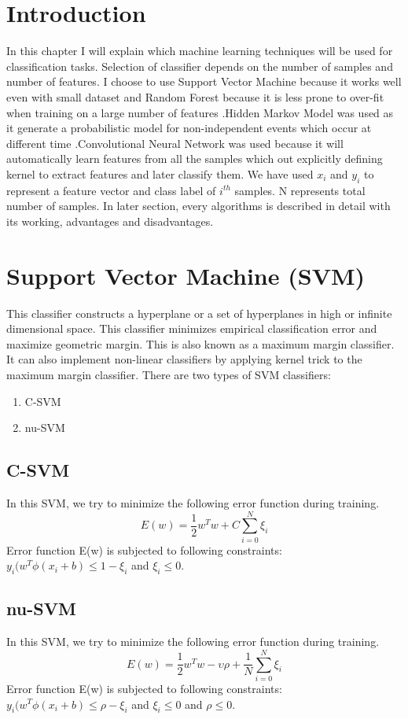 \documentclass[11pt]{report}
\begin{document}
\section{Introduction}
In this chapter I will explain which machine learning techniques will be used for classification tasks. Selection of classifier depends on the number of samples and number of features. I choose to use Support Vector Machine because it works well even with small dataset and Random Forest because it is less prone to over-fit when training on a large number of features .Hidden Markov Model was used as it generate a probabilistic model for non-independent  events which occur at different time .Convolutional Neural Network was used because it will automatically learn features from all the samples which out explicitly defining kernel to extract features and later classify them. We have used $x_{i}$ and $y_{i}$ to represent a feature vector and class label of $i^{th}$ samples. N represents total number of samples. In later section, every algorithms is described in detail with its working, advantages and disadvantages.   

\section{Support Vector Machine (SVM)} 
This classifier constructs a hyperplane or a set of hyperplanes in high or infinite dimensional space. This classifier minimizes empirical classification error and maximize geometric margin. This is also known as a maximum margin classifier. It can also implement non-linear classifiers by applying kernel trick to the maximum margin classifier.
There are two types of SVM classifiers:
\begin{enumerate}
\item C-SVM
\item nu-SVM
\end{enumerate}

\subsection{C-SVM}
In this SVM, we try to minimize the following error function during training.
\begin{equation}
E(w)=\frac{1}{2} w^T w + C \sum\limits_{i=0}^{N} \xi_{i}
\end{equation}
Error function E(w) is subjected to following constraints:
$y_{i}(w^T \phi(x_{i} + b)\leq 1- \xi_{i}$
and $\xi_{i}\leq 0$.

\subsection{nu-SVM}
In this SVM, we try to minimize the following error function during training.
\begin{equation}
E(w)=\frac{1}{2}w^T w - \upsilon \rho + \frac{1}{N}\sum\limits_{i=0}^{N}\xi_{i}
\end{equation}
Error function E(w) is subjected to following constraints:
$y_{i}(w^T \phi(x_{i} + b)\leq \rho-\xi_{i}$
and $\xi_{i}\leq 0$ and $\rho \leq 0$.
\end{document}
